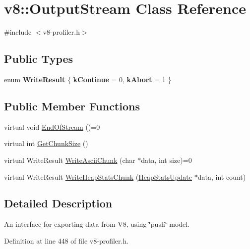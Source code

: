 \hypertarget{classv8_1_1OutputStream}{}\section{v8\+:\+:Output\+Stream Class Reference}
\label{classv8_1_1OutputStream}


{\ttfamily \#include $<$v8-\/profiler.\+h$>$}

\subsection*{Public Types}
\begin{DoxyCompactItemize}
\item 
\mbox{\label{classv8_1_1OutputStream_a336c7605a0ce4fbe6f6fca3b03bc16de}} 
enum {\bfseries Write\+Result} \{ {\bfseries k\+Continue} = 0, 
{\bfseries k\+Abort} = 1
 \}
\end{DoxyCompactItemize}
\subsection*{Public Member Functions}
\begin{DoxyCompactItemize}
\item 
virtual void \mbox{\hyperlink{classv8_1_1OutputStream_a6c5c308367fc5776bcbedff0e94d6049}{End\+Of\+Stream}} ()=0
\item 
virtual int \mbox{\hyperlink{classv8_1_1OutputStream_a93bdaa790cbd66a7283fad2cca3f48f7}{Get\+Chunk\+Size}} ()
\item 
virtual Write\+Result \mbox{\hyperlink{classv8_1_1OutputStream_a42adc62ebe43d00159f80328538f217f}{Write\+Ascii\+Chunk}} (char $\ast$data, int size)=0
\item 
virtual Write\+Result \mbox{\hyperlink{classv8_1_1OutputStream_a104fd1a0b5ef685e1d4967aaacbb9e9d}{Write\+Heap\+Stats\+Chunk}} (\mbox{\hyperlink{structv8_1_1HeapStatsUpdate}{Heap\+Stats\+Update}} $\ast$data, int count)
\end{DoxyCompactItemize}


\subsection{Detailed Description}
An interface for exporting data from V8, using \char`\"{}push\char`\"{} model. 

Definition at line 448 of file v8-\/profiler.\+h.



